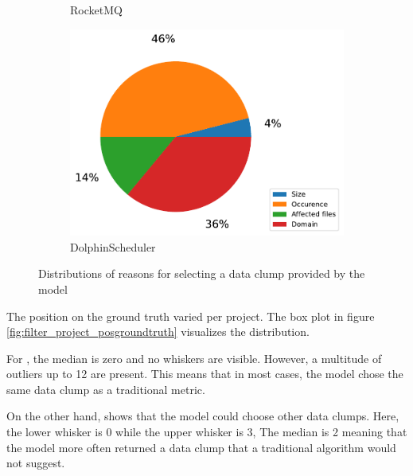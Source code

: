 \begin{figure}[ht!]
\begin{subfigure}[t]{0.48\columnwidth}
        \caption{RocketMQ}
       \label{fig:filter_reason_rocketmq}
    \end{subfigure}
        \begin{subfigure}[t]{0.6\columnwidth}
        \includegraphics[width=1.3\columnwidth]{figures/chapter5/filter_reason_type_dolphin.pdf}
        \caption{DolphinScheduler}
        \label{fig:filter_reason_dolphinscheduler}
    \end{subfigure}

    \caption{Distributions of reasons for selecting a data clump provided by the model }
    
    \label{fig:filter_reason}
\end{figure}

The position on the ground truth varied per project. The box plot in figure \ref{fig:filter_project_posgroundtruth} visualizes the distribution.  

For \argouml, the median is zero and no whiskers  are visible. However, a multitude of outliers up to 12 are present. This means that in most cases, the model chose the same data clump as a traditional metric. 

On the other hand, \rocketmq shows that the model could choose other data clumps. Here, the lower whisker is 0 while the upper whisker is  3, The median is 2 meaning that the model more often returned a data clump that a traditional algorithm would not suggest.

